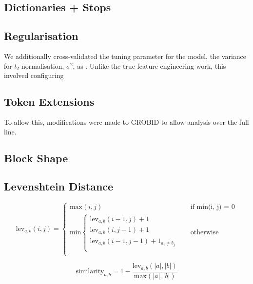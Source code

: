 \subsection{Dictionaries + Stops}
\subsection{Regularisation}

We additionally cross-validated the tuning parameter for the model, the variance for $l_2$ normalisation, $\sigma^2$, as . Unlike the true feature engineering work, this involved configuring 

\subsection{Token Extensions}

To allow this, modifications were made to GROBID to allow analysis over the full line.

\subsection{Block Shape}

\subsection{Levenshtein Distance}

\begin{equation}
  \text{lev}_{a, b}(i, j) = 
  \begin{cases} 
  	\text{max}(i, j) &\quad\text{if min(i, j) = 0} \\
	\text{min}
		\begin{cases}
			\text{lev}_{a, b}(i - 1, j) + 1 \\
			\text{lev}_{a, b}(i, j - 1) + 1 \\
			\text{lev}_{a, b}(i - 1, j - 1) + 1_{a_i \neq b_j} \\
		\end{cases} &\quad\text{otherwise} \\
  \end{cases}
\label{eq:levenshtein}
\end{equation}

\begin{equation}
\text{similarity}_{a, b} = 1 - \frac{\text{lev}_{a, b}(|a|, |b|)}{\text{max}(|a|, |b|)}
\label{eq:levenshteinsimilarity}
\end{equation}

